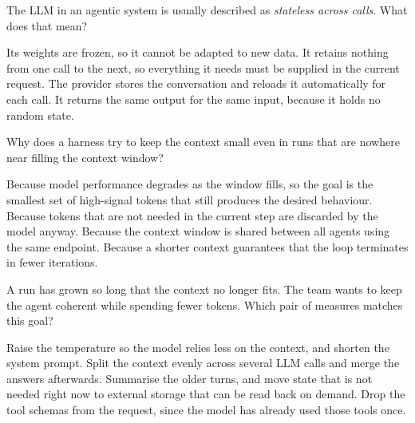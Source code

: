 \begin{questions}


\qitem The LLM in an agentic system is usually described as \emph{stateless across calls}. What does
that mean?
\begin{choices}
  \choice Its weights are frozen, so it cannot be adapted to new data.
  \CorrectChoice It retains nothing from one call to the next, so everything it needs must be supplied in the current request.
  \choice The provider stores the conversation and reloads it automatically for each call.
  \choice It returns the same output for the same input, because it holds no random state.
\end{choices}
\dontknow
{}

\qitem Why does a harness try to keep the context small even in runs that are nowhere near filling the
context window?
\begin{choices}
  \CorrectChoice Because model performance degrades as the window fills, so the goal is the smallest set of high-signal tokens that still produces the desired behaviour.
  \choice Because tokens that are not needed in the current step are discarded by the model anyway.
  \choice Because the context window is shared between all agents using the same endpoint.
  \choice Because a shorter context guarantees that the loop terminates in fewer iterations.
\end{choices}
\dontknow
{}

\qitem A run has grown so long that the context no longer fits. The team wants to keep the agent
coherent while spending fewer tokens. Which pair of measures matches this goal?
\begin{choices}
  \choice Raise the temperature so the model relies less on the context, and shorten the system prompt.
  \choice Split the context evenly across several LLM calls and merge the answers afterwards.
  \CorrectChoice Summarise the older turns, and move state that is not needed right now to external storage that can be read back on demand.
  \choice Drop the tool schemas from the request, since the model has already used those tools once.
\end{choices}
\dontknow
{}


\end{questions}
